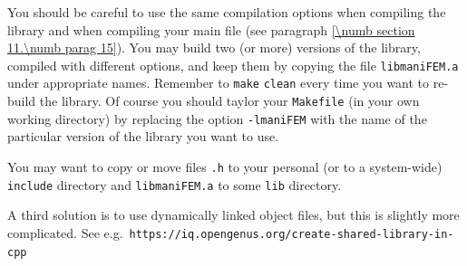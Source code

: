 You should be careful to use the same compilation options when compiling the library and
when compiling your main file (see paragraph \ref{\numb section 11.\numb parag 15}).
You may build two (or more) versions of the library, compiled with different options,
and keep them by copying the file {\small\tt libmaniFEM.a} under appropriate names.
Remember to {\small\tt make} {\small\tt clean} every time you want to re-build the library.
Of course you should taylor your {\small\tt Makefile} (in your own working directory)
by replacing the option {\small\tt -lmaniFEM} with the name of the particular version
of the library you want to use.

You may want to copy or move files {\small\tt *.h} to your personal (or to a system-wide)
{\small\tt include} directory and {\small\tt libmaniFEM.a} to some {\small\tt lib} directory.

A third solution is to use dynamically linked object files,
but this is slightly more complicated.
See e.g.\ {\small\tt https://iq.opengenus.org/create-shared-library-in-cpp}


